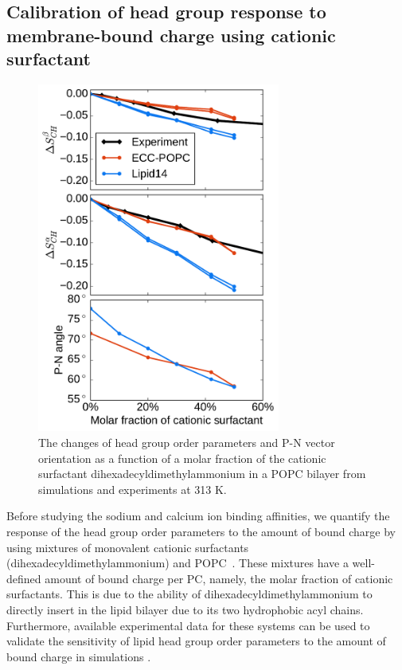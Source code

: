 \documentclass[journal=jpcbfk,manuscript=article]{achemso}
\begin{document}

\subsection{Calibration of head group response to membrane-bound charge using cationic surfactant}\label{section:boundCHARGE}

\begin{figure}[tb!]
  \centering
  \includegraphics[width=8.0cm]{../Fig/ipython_nb/PN_angle_OrdPars-A-B_L14-ECCL17_q80_sig89_surf.pdf}
  \caption{\label{OrderParameterCHANGESsurf}
    The changes of head group order parameters and P-N vector orientation as a function of
    a molar fraction of the cationic surfactant dihexadecyldimethylammonium in a POPC bilayer
    from simulations and experiments \cite{scherer89} at 313 K.
  }
\end{figure}

Before studying the sodium and calcium ion binding affinities, we quantify the response of the head group order parameters to the amount of bound charge by using mixtures of monovalent cationic surfactants (dihexadecyldimethylammonium) and POPC~\cite{scherer89}. These mixtures have a well-defined amount of bound charge per PC, namely, the molar fraction of cationic surfactants. This is due to the ability of dihexadecyldimethylammonium to directly insert in the lipid bilayer due to its two hydrophobic acyl chains. Furthermore, available experimental data for these systems can be used to validate the sensitivity of lipid head group order parameters to the amount of bound charge in simulations \cite{scherer89}.
\end{document}
